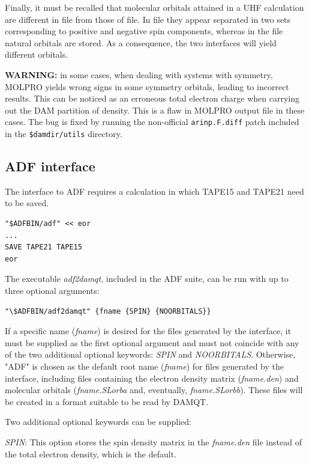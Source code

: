 \documentclass[10pt]{article}
\begin{document}
Finally, it must be recalled that molecular orbitals attained in a 
UHF calculation are different in \out{ } file 
from those of \xml{ } file. In \out{ } file they appear separated in two sets corresponding 
to positive and negative spin components, whereas in the \xml{ } file natural orbitals 
are stored. As a consequence, the two interfaces will yield different orbitals.

{\bf WARNING:} in some cases, when dealing with systems with symmetry, MOLPRO yields wrong 
signs in some symmetry orbitals, leading to incorrect results. This can be noticed as an 
erroneous total electron charge when carrying out the DAM partition of density. 
This is a flaw in MOLPRO output file in these cases. The bug is fixed by running 
the non-official \texttt{arinp.F.diff} patch included in the \texttt{\$damdir/utils} directory.


\subsection{ADF interface \label{sec:5.3}}

The interface to ADF requires a calculation in which 
TAPE15 and TAPE21 need to be saved. 

\begin{verbatim}
"$ADFBIN/adf" << eor
...
SAVE TAPE21 TAPE15
eor
\end{verbatim}

The executable {\it adf2damqt}, included in the ADF suite, can be run with up to three optional arguments: 

\begin{verbatim}
"\$ADFBIN/adf2damqt" {fname {SPIN} {NOORBITALS}}
\end{verbatim}

If a specific name ({\it fname}) is desired for the files generated 
by the interface, it must be supplied 
as the first optional argument and must not coincide 
with any of the two additional optional keywords: {\it SPIN} and {\it NOORBITALS}. Otherwise,
"ADF" is chosen as the default root name ({\it fname}) 
for files generated by the interface, including files containing the electron 
density matrix ({\it fname.den}) and molecular orbitals ({\it fname.SLorba} and, 
eventually, {\it fname.SLorbb}). These files will be created in a format suitable to be 
read by DAMQT.

Two additional optional keywords can be supplied:

{\it SPIN}: This option stores the spin density matrix in the {\it fname.den} file instead of 
the total electron density, which is the default.
\end{document}
